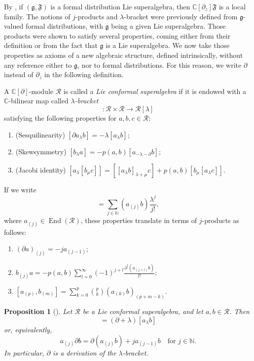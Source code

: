 \documentclass[a4paper, 12pt, reqno]{amsart}
\newtheorem{proposition}[theorem]{Proposition}
\theoremstyle{remark}
\DeclareMathOperator{\End}{End}
\begin{document}
By , if $(\mathfrak{g}, \mathfrak{F})$ is a formal distribution Lie superalgebra, then $\mathbb{C}[\partial_z]\mathfrak{F}$ is a local family.
The notions of $j$-products and $\lambda$-bracket were previously defined from $\mathfrak{g}$-valued formal distributions, with $\mathfrak{g}$ being a given Lie superalgebra.
Those products were shown to satisfy several properties, coming either from their definition or from the fact that $\mathfrak{g}$ is a Lie superalgebra.
We now take those properties as axioms of a new algebraic structure, defined intrinsically, without any reference either to $\mathfrak{g}$, nor to formal distributions.
For this reason, we write $\partial$ instead of $\partial_z$ in the following definition.

A $\mathbb{C}[\partial]$-module $\mathcal{R}$ is called a \emph{Lie conformal superalgebra} if it is endowed with a $\mathbb{C}$-bilinear map called \emph{$\lambda$-bracket}
\begin{equation*}
  [\bullet_{\lambda}\bullet]: \mathcal{R} \times \mathcal{R} \to \mathcal{R}[\lambda]
\end{equation*}
satisfying the following properties for $a, b, c \in \mathcal{R}$:
\begin{enumerate}
\item (Sesquilinearity) $[\partial a_{\lambda}b] = -\lambda[a_{\lambda}b]$;
\item (Skewsymmetry) $[b_{\lambda}a] = -p(a, b)[a_{-\lambda - \partial}b]$;
\item (Jacobi identity) $[a_{\lambda}[b_{\mu}c]] = [[a_{\lambda}b]_{\lambda + \mu}c] + p(a, b)[b_{\mu}[a_{\lambda}c]]$.
\end{enumerate}

If we write
\begin{equation*}
  [a_{\lambda}b] = \sum_{j \in \mathbb{N}}(a_{(j)}b)\frac{\lambda^j}{j!},
\end{equation*}
where $a_{(j)} \in \End(\mathcal{R})$, these properties translate in terms of $j$-products as follows:
\begin{enumerate}
\item $(\partial a)_{(j)} = -ja_{(j - 1)}$;
\item $b_{(j)}a = -p(a, b)\sum_{l = 0}^{\infty}(-1)^{j + l}\frac{\partial^l(a_{(j + l)}b)}{l!}$;
\item $[a_{(p)}, b_{(m)}] = \sum_{k = 0}^p\binom{p}{k}(a_{(k)}b)_{(p + m - k)}$.
\end{enumerate}

\begin{proposition}[{\cite[Remark 2.5.3]{nozaradan_introduction_2008}}]
  \label{prp:4}
  Let $\mathcal{R}$ be a Lie conformal superalgebra, and let $a, b \in \mathcal{R}$.
  Then
  \begin{equation*}
    [a_{\lambda}\partial b] = (\partial + \lambda)[a_{\lambda}b]
  \end{equation*}
  or, equivalently,
  \begin{equation*}
    a_{(j)}\partial b = \partial(a_{(j)}b) + ja_{(j - 1)}b \quad \text{for $j \in \mathbb{N}$}.
  \end{equation*}
  In particular, $\partial$ is a derivation of the $\lambda$-bracket.
\end{proposition}
\end{document}
